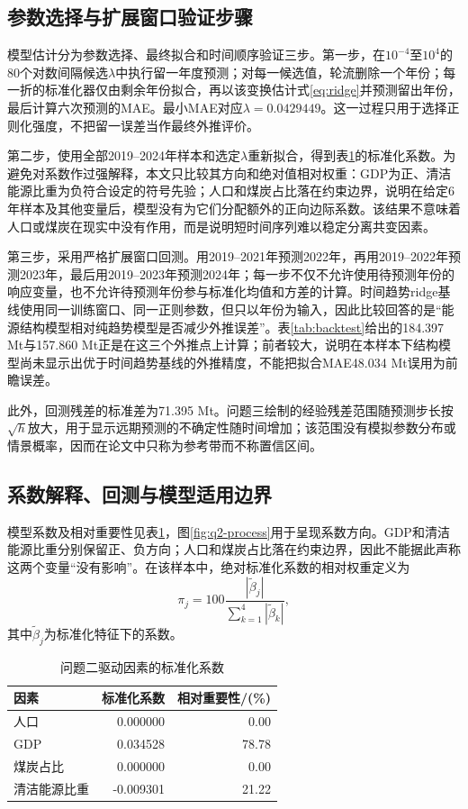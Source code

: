 \documentclass[12pt,a4paper]{ctexart}
\theoremstyle{definition}
\theoremstyle{plain}
\theoremstyle{remark}
\begin{document}
\subsection{参数选择与扩展窗口验证步骤}
模型估计分为参数选择、最终拟合和时间顺序验证三步。第一步，在$10^{-4}$至$10^{4}$的80个对数间隔候选$\lambda$中执行留一年度预测；对每一候选值，轮流删除一个年份；每一折的标准化器仅由剩余年份拟合，再以该变换估计式\eqref{eq:ridge}并预测留出年份，最后计算六次预测的MAE。最小MAE对应$\lambda=0.0429449$。这一过程只用于选择正则化强度，不把留一误差当作最终外推评价。

第二步，使用全部2019--2024年样本和选定$\lambda$重新拟合，得到表\ref{tab:coef}的标准化系数。为避免对系数作过强解释，本文只比较其方向和绝对值相对权重：GDP为正、清洁能源比重为负符合设定的符号先验；人口和煤炭占比落在约束边界，说明在给定6年样本及其他变量后，模型没有为它们分配额外的正向边际系数。该结果不意味着人口或煤炭在现实中没有作用，而是说明短时间序列难以稳定分离共变因素。

第三步，采用严格扩展窗口回测。用2019--2021年预测2022年，再用2019--2022年预测2023年，最后用2019--2023年预测2024年；每一步不仅不允许使用待预测年份的响应变量，也不允许待预测年份参与标准化均值和方差的计算。时间趋势ridge基线使用同一训练窗口、同一正则参数，但只以年份为输入，因此比较回答的是“能源结构模型相对纯趋势模型是否减少外推误差”。表\ref{tab:backtest}给出的184.397 Mt与157.860 Mt正是在这三个外推点上计算；前者较大，说明在本样本下结构模型尚未显示出优于时间趋势基线的外推精度，不能把拟合MAE48.034 Mt误用为前瞻误差。

此外，回测残差的标准差为71.395 Mt。问题三绘制的经验残差范围随预测步长按$\sqrt{h}$放大，用于显示远期预测的不确定性随时间增加；该范围没有模拟参数分布或情景概率，因而在论文中只称为参考带而不称置信区间。
\subsection{系数解释、回测与模型适用边界}
模型系数及相对重要性见表\ref{tab:coef}，图\ref{fig:q2-process}用于呈现系数方向。GDP和清洁能源比重分别保留正、负方向；人口和煤炭占比落在约束边界，因此不能据此声称这两个变量“没有影响”。在该样本中，绝对标准化系数的相对权重定义为
\begin{equation}
\pi_j=100\frac{|\widetilde\beta_j|}{\sum_{k=1}^{4}|\widetilde\beta_k|},
\label{eq:importance}
\end{equation}
其中$\widetilde\beta_j$为标准化特征下的系数。

\begin{table}[H]
\centering
\caption{问题二驱动因素的标准化系数}
\label{tab:coef}
\begin{tabular}{lrr}
\toprule
因素 & 标准化系数 & 相对重要性/(\%)\\
\midrule
人口 & 0.000000 & 0.00\\
GDP & 0.034528 & 78.78\\
煤炭占比 & 0.000000 & 0.00\\
清洁能源比重 & -0.009301 & 21.22\\
\bottomrule
\end{tabular}
\end{table}
\end{document}
